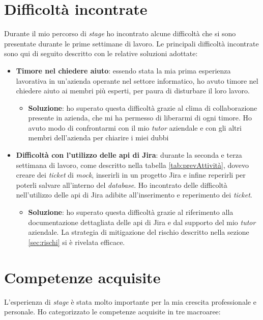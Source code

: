 \section{Difficoltà incontrate}
Durante il mio percorso di \textit{stage} ho incontrato alcune difficoltà che si sono presentate durante le prime settimane di lavoro. Le principali difficoltà incontrate sono qui di seguito descritto con le relative soluzioni adottate:
\begin{itemize}
    \item \textbf{Timore nel chiedere aiuto}: essendo stata la mia prima esperienza lavorativa in un'azienda operante nel settore informatico, ho avuto timore nel chiedere aiuto ai membri più esperti, per paura di disturbare il loro lavoro. 
        \begin{itemize} 
        \item \textbf{Soluzione}: ho superato questa difficoltà grazie al clima di collaborazione presente in azienda, che mi ha permesso di liberarmi di ogni timore. Ho avuto modo di confrontarmi con il mio \textit{tutor} aziendale e con gli altri membri dell'azienda per chiarire i miei dubbi
        \end{itemize}
    \item \textbf{Difficoltà con l'utilizzo delle \gls{api} di Jira}: durante la seconda e terza settimana di lavoro, come descritto nella tabella \ref{tab:prevAttività}, dovevo creare dei \textit{ticket} di \textit{mock}, inserirli in un progetto Jira e infine reperirli per poterli salvare all'interno del \textit{database}. Ho incontrato delle difficoltà nell'utilizzo delle \gls{api} di Jira adibite all'inserimento e reperimento dei \textit{ticket}. \begin{itemize} \item \textbf{Soluzione}: ho superato questa difficoltà grazie al riferimento alla documentazione dettagliata delle \gls{api} di Jira e dal supporto del mio \textit{tutor} aziendale. La strategia di mitigazione del rischio descritto nella sezione \ref{sec:rischi} si è rivelata efficace. \end{itemize}
\end{itemize}

\section{Competenze acquisite}
L'esperienza di \textit{stage} è stata molto importante per la mia crescita professionale e personale. Ho categorizzato le competenze acquisite in tre macroaree:

